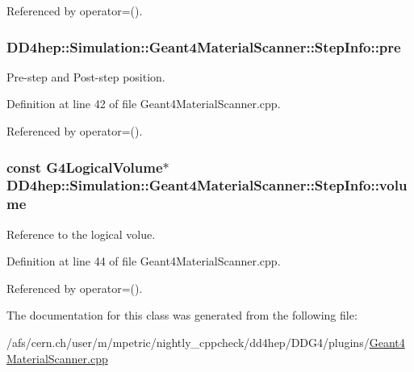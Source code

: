 Referenced by operator=().\hypertarget{class_d_d4hep_1_1_simulation_1_1_geant4_material_scanner_1_1_step_info_a8a5e62192e0103b052eb2c5885366aec}{
\subsubsection[{pre}]{ {\bf DD4hep::Simulation::Geant4MaterialScanner::StepInfo::pre}}}
\label{class_d_d4hep_1_1_simulation_1_1_geant4_material_scanner_1_1_step_info_a8a5e62192e0103b052eb2c5885366aec}


Pre-\/step and Post-\/step position. 

Definition at line 42 of file Geant4MaterialScanner.cpp.

Referenced by operator=().\hypertarget{class_d_d4hep_1_1_simulation_1_1_geant4_material_scanner_1_1_step_info_ac413cc2216dfa5d0d174c48fd4acbe5b}{
\subsubsection[{volume}]{\setlength{\rightskip}{0pt plus 5cm}const G4LogicalVolume$\ast$ {\bf DD4hep::Simulation::Geant4MaterialScanner::StepInfo::volume}}}
\label{class_d_d4hep_1_1_simulation_1_1_geant4_material_scanner_1_1_step_info_ac413cc2216dfa5d0d174c48fd4acbe5b}


Reference to the logical volue. 

Definition at line 44 of file Geant4MaterialScanner.cpp.

Referenced by operator=().

The documentation for this class was generated from the following file:\begin{DoxyCompactItemize}
\item 
/afs/cern.ch/user/m/mpetric/nightly\_\-cppcheck/dd4hep/DDG4/plugins/\hyperlink{_geant4_material_scanner_8cpp}{Geant4MaterialScanner.cpp}\end{DoxyCompactItemize}
